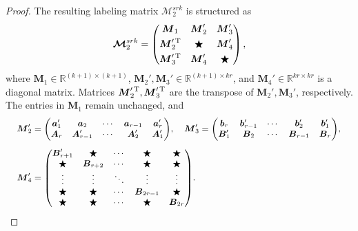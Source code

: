 \documentclass[12pt]{article}
\begin{document}
\begin{proof}
The resulting labeling matrix $\boldsymbol{\mathcal{M}}_{2}^{srk}$ is structured as
\begin{equation*}
 \boldsymbol{\mathcal{M}}_{2}^{srk}=\begin{pmatrix}
    \boldsymbol{M}_{1} &  \boldsymbol{M}_{2}' &  \boldsymbol{M}_{3}'\\[3pt]
    \boldsymbol{M}_{2}'^{\rm{\,T}} & \bigstar & \boldsymbol{M}_{4}'\\[3pt]
   \boldsymbol{M}_{3}'^{\rm{\,T}}&  \boldsymbol{M}_{4}' & \bigstar
  \end{pmatrix},
\end{equation*}
where $\boldsymbol{M}_{1}\in \mathbb{R}^{(k+1)\times (k+1)}$, $\boldsymbol{M}_{2}',\boldsymbol{M}_{3}'\in\mathbb{R}^{(k+1)\times kr}$, and $\boldsymbol{M}_{4}'\in\mathbb{R}^{kr\times kr}$ is a diagonal matrix. Matrices $\boldsymbol{M}_{2}'^{\rm{\,T}},\boldsymbol{M}_{3}'^{\rm{\,T}}$ are the transpose of $\boldsymbol{M}_{2}',\boldsymbol{M}_{3}'$, respectively. The entries in $\boldsymbol{M}_{1}$ remain unchanged, and
\begin{align*}
&{\small \boldsymbol{M}_{2}' = \begin{pmatrix}
 \boldsymbol{a}_{1}'& \boldsymbol{a}_{2} & \cdots & \boldsymbol{a}_{r-1}& \boldsymbol{a}_{r}'\\
 \boldsymbol{A}_{r}& \boldsymbol{A}'_{r-1}&\cdots & \boldsymbol{A}'_{2}&\boldsymbol{A}_{1}'
 \end{pmatrix}},
\quad {\small  \boldsymbol{M}_{3}'  = \begin{pmatrix}
 \boldsymbol{b}_{r}& \boldsymbol{b}'_{r-1} & \cdots & \boldsymbol{b}'_{2}& \boldsymbol{b}'_{1}\\
 \boldsymbol{B}_{1}'& \boldsymbol{B}_{2}&\cdots &\boldsymbol{B}_{r-1}&\boldsymbol{B}_{r}
 \end{pmatrix} }, \\[4pt]
 &{\small \boldsymbol{M}_{4}'   = \begin{pmatrix}
\boldsymbol{B}_{r+1}'& \bigstar & \cdots & \bigstar& \bigstar\\
\bigstar& \boldsymbol{B}_{r+2}&\cdots & \bigstar&\bigstar\\
\vdots &\vdots &\ddots &\vdots&\vdots \\
 \bigstar & \bigstar &\cdots&\boldsymbol{B}_{2r-1} & \bigstar\\
 \bigstar& \bigstar& \cdots & \bigstar& \boldsymbol{B}_{2r}
    \end{pmatrix}}.
\end{align*}


\end{proof}
\end{document}
